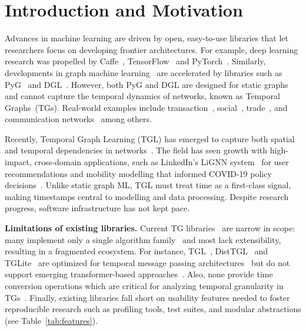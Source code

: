 \section{Introduction and Motivation}

Advances in machine learning are driven by open, easy-to-use libraries that let researchers focus on developing frontier architectures. For example, deep learning research was propelled by Caffe~\citep{DBLP:conf/mm/JiaSDKLGGD14}, TensorFlow~\citep{DBLP:conf/osdi/AbadiBCCDDDGIIK16} and PyTorch~\citep{DBLP:conf/nips/PaszkeGMLBCKLGA19}. Similarly, developments in graph machine learning~\citep{kipfsemi,velivckovic2017graph, DBLP:journals/corr/abs-2012-09699,rampavsek2022recipe} are accelerated by libraries such as PyG~\citep{DBLP:journals/corr/abs-1903-02428, DBLP:journals/corr/abs-2507-16991} and DGL~\citep{wang2019deep}. However, both PyG and DGL are designed for static graphs and cannot capture the temporal dynamics of networks, known as Temporal Graphs~(TGs). Real-world examples include transaction~\citep{DBLP:conf/nips/ShamsiVKGA22}, social~\citep{huang2023temporal}, trade~\citep{poursafaei2022towards}, and communication networks~\citep{DBLP:journals/corr/abs-2011-13085} among others. 

Recently, Temporal Graph Learning (TGL) has emerged to capture both spatial and temporal dependencies in networks~\citep{cornell2025power,cao2020spectral,han2014chronos}. The field has seen growth with high-impact, cross-domain applications, such as LinkedIn's LiGNN system~\citep{borisyuk2024lignn} for user recommendations and mobility modelling that informed COVID-19 policy decisions~\citep{chang2021mobility}. Unlike static graph ML, TGL must treat time as a first-class signal, making timestamps central to modelling and data processing. Despite research progress, software infrastructure has not kept pace.


\textbf{Limitations of existing libraries.} Current TG libraries~\citep{dygfomer,DBLP:conf/cikm/RozemberczkiSHP21} are narrow in scope: many implement only a single algorithm family~\citep{10.1145/3620665.3640414, DBLP:conf/sc/ZhouZSKP23} and most lack extensibility, resulting in a fragmented ecosystem. For instance, TGL~\citep{DBLP:journals/corr/abs-2203-14883}, DistTGL~\citep{DBLP:conf/sc/ZhouZSKP23} and TGLite~\citep{10.1145/3620665.3640414} are optimized for temporal message passing architectures~\citep{tgn,tgat} but do not support emerging transformer-based approaches~\citep{dygfomer,DBLP:journals/corr/abs-2507-11836}. Also, none provide time conversion operations which are critical for analyzing temporal granularity in TGs~\citep{utg}. Finally, existing libraries fall short on usability features needed to foster reproducible research such as profiling tools, test suites, and modular abstractions (see Table~\ref{tab:features}).

